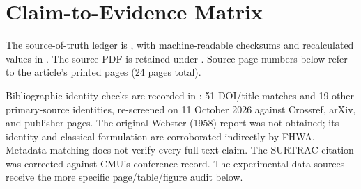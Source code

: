 \documentclass[12pt,a4paper]{report}
\begin{document}
\chapter{Claim-to-Evidence Matrix}\label{app:evidence}
The source-of-truth ledger is , with machine-readable checksums and recalculated values in . The source PDF is retained under . Source-page numbers below refer to the article's printed pages (24 pages total).

Bibliographic identity checks are recorded in : 51 DOI/title matches and 19 other primary-source identities, re-screened on 11 October 2026 against Crossref, arXiv, and publisher pages. The original Webster (1958) report was not obtained; its identity and classical formulation are corroborated indirectly by FHWA. Metadata matching does not verify every full-text claim. The SURTRAC citation was corrected against CMU's conference record. The experimental data sources receive the more specific page/table/figure audit below.
\end{document}
